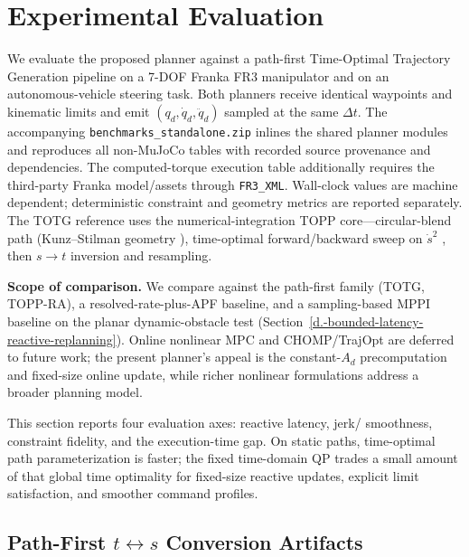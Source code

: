 \section{Experimental Evaluation}\label{vi.-experimental-evaluation}

We evaluate the proposed planner against a path-first Time-Optimal
Trajectory Generation pipeline on a 7-DOF Franka FR3 manipulator and on
an autonomous-vehicle steering task. Both planners receive identical
waypoints and kinematic limits and emit \((q_d, \dot q_d, \ddot q_d)\)
sampled at the same \(\Delta t\). The accompanying
\texttt{benchmarks\_standalone.zip} inlines the shared planner modules and
reproduces all non-MuJoCo tables with recorded source provenance and
dependencies. The computed-torque execution table additionally requires the
third-party Franka model/assets through \texttt{FR3\_XML}. Wall-clock values are
machine dependent; deterministic constraint and geometry metrics are reported
separately. The
TOTG reference uses the numerical-integration TOPP core---circular-blend
path (Kunz--Stilman geometry \cite{kunz2012}), time-optimal forward/backward
sweep on \(\dot s^2\) \cite{toppra}, then \(s\!\to\!t\) inversion and
resampling.

\textbf{Scope of comparison.} We compare against the path-first family
(TOTG, TOPP-RA), a resolved-rate-plus-APF baseline, and a sampling-based
MPPI baseline on the planar dynamic-obstacle test
(Section~\ref{d.-bounded-latency-reactive-replanning}). Online nonlinear MPC
and CHOMP/TrajOpt are deferred to future work; the present planner's appeal
is the constant-\(A_d\) precomputation and fixed-size online update, while
richer nonlinear formulations address a broader planning model.

This section reports four evaluation axes: reactive latency, jerk/
smoothness, constraint fidelity, and the execution-time gap. On static
paths, time-optimal path parameterization is faster; the fixed time-domain
QP trades a small amount of that global time optimality for fixed-size reactive
updates, explicit limit satisfaction, and smoother command profiles.

\subsection{\texorpdfstring{Path-First \(t\!\leftrightarrow\!s\)
Conversion Artifacts}{Path-First t-s Conversion Artifacts}}\label{a.-path-first-tleftrightarrows-conversion-artifacts}

